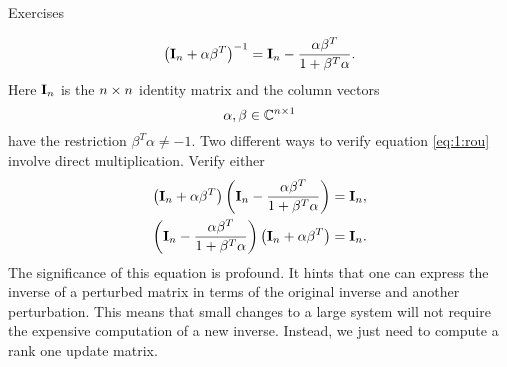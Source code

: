 \begin{xcb}{Exercises}
\begin{enumerate}
\begin{equation}
 \left( \textbf{I}_{n}+\alpha \beta^{T} \right)^{-1} = \textbf{I}_{n} - \frac{\alpha \beta^{T}}{1+\beta^{T}\alpha}.
 \label{eq:1:rou}
\end{equation}
Here $\textbf{I}_{n}$ is the $n \times n$ identity matrix and the column vectors
\begin{equation}
  \alpha, \beta \in \mathbb{C}^{n \times 1}
\end{equation}
have the restriction $\beta^{T}\alpha\ne-1$.
Two different ways to verify equation \eqref{eq:1:rou} involve direct multiplication. Verify either
\begin{equation}
  \begin{split}
    \left( \textbf{I}_{n}+\alpha \beta^{T} \right)\left( \textbf{I}_{n} - \frac{\alpha \beta^{T}}{1+\beta^{T}\alpha} \right) &= \textbf{I}_{n},\\
    \left( \textbf{I}_{n} - \frac{\alpha \beta^{T}}{1+\beta^{T}\alpha} \right)\left( \textbf{I}_{n}+\alpha \beta^{T} \right) &= \textbf{I}_{n}.
  \end{split}
\end{equation}
The significance of this equation is profound. It hints that one can express the inverse of a perturbed matrix in terms of the original inverse and another perturbation. This means that small changes to a large system will not require the expensive computation of a new inverse. Instead, we just need to compute a rank one update matrix.


\end{enumerate}
\end{xcb}
